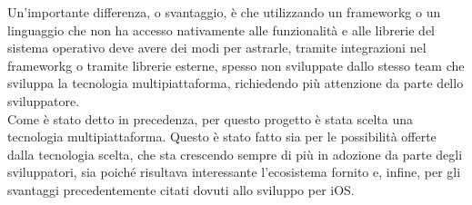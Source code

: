 Un'importante differenza, o svantaggio, è che utilizzando un \gls{frameworkg} o un linguaggio che non ha accesso nativamente alle funzionalità e alle librerie del sistema operativo deve avere dei modi per astrarle, tramite integrazioni nel \gls{frameworkg} o tramite librerie esterne, spesso non sviluppate dallo stesso team che sviluppa la tecnologia multipiattaforma, richiedendo più attenzione da parte dello sviluppatore.\\
Come è stato detto in precedenza, per questo progetto è stata scelta una tecnologia multipiattaforma. Questo è stato fatto sia per le possibilità offerte dalla tecnologia scelta, che sta crescendo sempre di più in adozione da parte degli sviluppatori, sia poiché risultava interessante l'ecosistema fornito e, infine, per gli svantaggi precedentemente citati dovuti allo sviluppo per iOS.